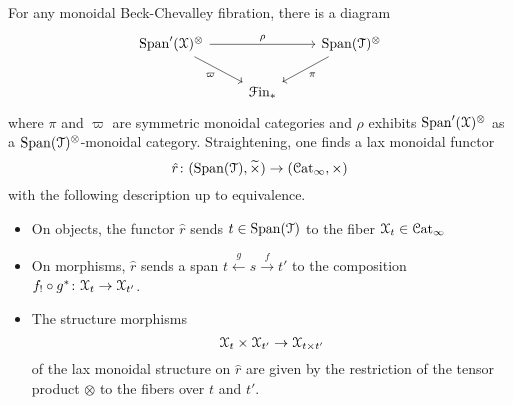 \documentclass[main.tex]{subfiles}
\begin{document}
\begin{proposition}
  For any monoidal Beck-Chevalley fibration, there is a diagram
  \begin{equation*}
    \begin{tikzcd}
      \Span'(\category{X})^{\otimes}
      \arrow[rr, "\rho"]
      \arrow[dr, swap, "\varpi"]
      && \Span(\category{T})^{\otimes}
      \arrow[dl, "\pi"]
      \\
      & \Finp
    \end{tikzcd}
  \end{equation*}
  where $\pi$ and $\varpi$ are symmetric monoidal categories and $\rho$ exhibits $\mathrm{Span}'(\mathcal{X})^{\otimes}$ as a $\mathrm{Span}(\mathcal{T})^{\otimes}$-monoidal category. Straightening, one finds a lax monoidal functor
  \begin{equation*}
    \hat{r}\colon (\mathrm{Span}(\mathcal{T}), \widetilde{\times}) \to (\mathcal{C}\mathrm{at}_{\infty}, \times)
  \end{equation*}
  with the following description up to equivalence.
  \begin{itemize}
    \item On objects, the functor $\hat{r}$ sends $t \in \mathrm{Span}(\mathcal{T})$ to the fiber $\mathcal{X}_{t} \in \mathcal{C}\mathrm{at}_{\infty}$

    \item On morphisms, $\hat{r}$ sends a span $t \overset{g}{\leftarrow} s \overset{f}{\to} t'$ to the composition $f_{!} \circ g^{*}\colon \mathcal{X}_{t} \to \mathcal{X}_{t'}$.

    \item The structure morphisms
      \begin{equation*}
        \mathcal{X}_{t} \times \mathcal{X}_{t'} \to \mathcal{X}_{t \times t'}
      \end{equation*}
      of the lax monoidal structure on $\hat{r}$ are given by the restriction of the tensor product $\otimes$ to the fibers over $t$ and $t'$.
  \end{itemize}
\end{proposition}
\end{document}
